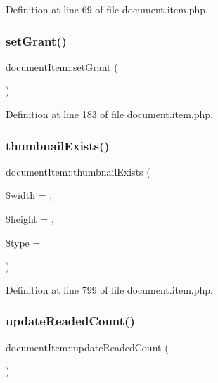 Definition at line 69 of file document.\+item.\+php.

\mbox{\label{classdocumentItem_a4a60e218cd41d2e23cf72bb720cf1cd8}} 
\subsubsection{\texorpdfstring{set\+Grant()}{setGrant()}}
{\footnotesize\ttfamily document\+Item\+::set\+Grant (\begin{DoxyParamCaption}{ }\end{DoxyParamCaption})}



Definition at line 183 of file document.\+item.\+php.

\mbox{\label{classdocumentItem_afb61d7a6035bceb7a48e3db699c6127b}} 
\subsubsection{\texorpdfstring{thumbnail\+Exists()}{thumbnailExists()}}
{\footnotesize\ttfamily document\+Item\+::thumbnail\+Exists (\begin{DoxyParamCaption}\item[{}]{\$width = {},  }\item[{}]{\$height = {},  }\item[{}]{\$type = {\ttfamily \textquotesingle{}\textquotesingle{}} }\end{DoxyParamCaption})}



Definition at line 799 of file document.\+item.\+php.

\mbox{\label{classdocumentItem_ac268c88d87f12155e5885510213028e3}} 
\subsubsection{\texorpdfstring{update\+Readed\+Count()}{updateReadedCount()}}
{\footnotesize\ttfamily document\+Item\+::update\+Readed\+Count (\begin{DoxyParamCaption}{ }\end{DoxyParamCaption})}

